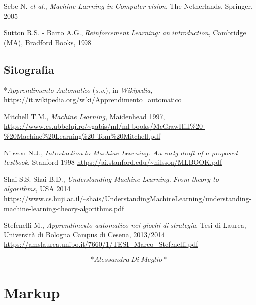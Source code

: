 \documentclass[
  b5paper,
  twoside,
  12pt,
  chapterprefix=false,
  bibliography=totocnumbered,
  parskip=false]{scrbook}
\begin{document}
Sebe N. \emph{et al}., \emph{Machine Learning in Computer vision}, The
Netherlands, Springer, 2005

Sutton R.S. - Barto A.G., \emph{Reinforcement Learning: an introduction},
Cambridge (MA), Bradford Books, 1998

\hypertarget{sitografia-20}{%
\section*{Sitografia}\label{sitografia-20}}

*\emph{Apprendimento Automatico} (\emph{s}.\emph{v}.), in \emph{Wikipedia},
\url{https://it.wikipedia.org/wiki/Apprendimento_automatico}

Mitchell T.M., \emph{Machine Learning}, Maidenhead 1997,
\url{https://www.cs.ubbcluj.ro/~gabis/ml/ml-books/McGrawHill\%20-\%20Machine\%20Learning\%20-Tom\%20Mitchell.pdf}

Nilsson N.J., \emph{Introduction to Machine Learning. An early draft of a
proposed textbook}, Stanford 1998
\url{https://ai.stanford.edu/~nilsson/MLBOOK.pdf}

Shai S.S.-Shai B.D., \emph{Understanding Machine Learning. From theory to
algorithms}, USA 2014
\url{https://www.cs.huji.ac.il/~shais/UnderstandingMachineLearning/understanding-machine-learning-theory-algorithms.pdf}

Stefenelli M., \emph{Apprendimento automatico nei giochi di strategia}, Tesi
di Laurea, Università di Bologna Campus di Cesena, 2013/2014
\url{https://amslaurea.unibo.it/7660/1/TESI_Marco_Stefenelli.pdf}

\[*Alessandra~Di~Meglio*\]

\hypertarget{markup}{%
\chapter{Markup}\label{markup}}
\end{document}
